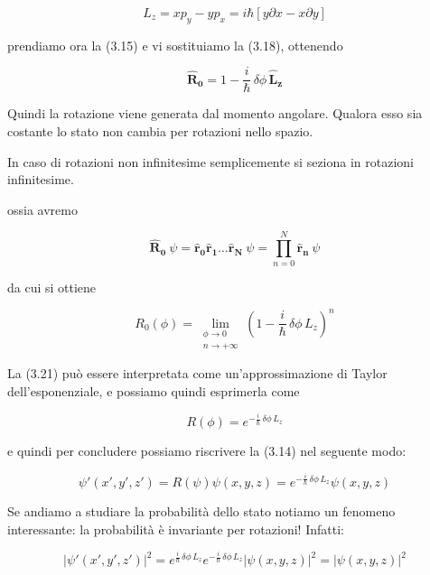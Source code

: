 \begin{equation}
L_z = x p_y - yp_x = i\hbar [y \partial x - x \partial y]
\end{equation}

prendiamo ora la (3.15) e vi sostituiamo la (3.18), ottenendo

\begin{equation}
\mathbf{\hat R_0} =  1 - \frac{i}{\hbar} \, \delta \phi \, \mathbf{\hat L_z}  
\end{equation}

Quindi la rotazione viene generata dal momento angolare. Qualora esso sia costante lo stato non cambia per rotazioni nello spazio.


In caso di rotazioni non infinitesime semplicemente si seziona in rotazioni infinitesime.

ossia avremo

\begin{equation}
\mathbf{\hat R_0} \: \psi =   \mathbf{\hat r_0}\mathbf{\hat r_1} \dots \mathbf{\hat r_N} \: \psi= \prod_{n=0}^{N} \mathbf{\hat r_n} \: \psi
\end{equation}

da cui si ottiene

\begin{equation}
R_0 (\phi) = \lim_{\substack{ \phi \rightarrow 0 \\ n \rightarrow + \infty}} \left( 
1 - \frac{i}{\hbar} \, \delta \phi \, L_z
 \right)^n
 \end{equation}

La (3.21) può essere interpretata come un'approssimazione di Taylor dell'esponenziale, e possiamo quindi esprimerla come

\begin{equation}
R(\phi) = e^{- \frac{i}{\hbar} \, \delta \phi \, L_z}
\end{equation}

e quindi per concludere possiamo riscrivere la (3.14) nel seguente modo: 

\begin{equation}
\psi ' (x',y',z')= R(\psi)\psi (x,y,z)= e^{- \frac{i}{\hbar} \, \delta \phi \, L_z} \psi (x,y,z)
\end{equation}

Se andiamo a studiare la probabilità dello stato notiamo un fenomeno interessante: la probabilità è invariante per rotazioni! Infatti:

\begin{equation}
|\psi ' (x',y',z')|^2 = e^{ \frac{i}{\hbar} \, \delta \phi \, L_z}e^{- \frac{i}{\hbar} \, \delta \phi \, L_z}|\psi (x,y,z)|^2 = |\psi (x,y,z)|^2
\end{equation}

